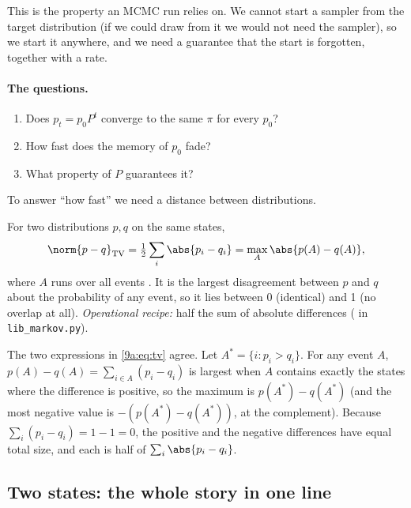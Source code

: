 This is the property an MCMC run relies on. We cannot start a sampler from the target
distribution (if we could draw from it we would not need the sampler), so we start it
anywhere, and we need a guarantee that the start is forgotten, together with a rate.

\paragraph{The questions.}
\begin{enumerate}[itemsep=1pt]
  \item Does $p_t=p_0P^t$ converge to the same $\pi$ for every $p_0$?
  \item How fast does the memory of $p_0$ fade?
  \item What property of $P$ guarantees it?
\end{enumerate}

To answer ``how fast'' we need a distance between distributions.

\begin{workdef}
For two distributions $p,q$ on the same states,
\begin{equation}
  \norm{p-q}_{\rm TV}=\tfrac12\sum_i\abs{p_i-q_i}=\max_{A}\abs{p(A)-q(A)},
  \label{9a:eq:tv}
\end{equation}
where $A$ runs over all events . It is the largest disagreement
between $p$ and $q$ about the probability of any event, so it lies between 0 (identical) and
1 (no overlap at all). \emph{Operational recipe:} half the sum of absolute differences
( in \texttt{lib\_markov.py}).
\end{workdef}

The two expressions in \eqref{9a:eq:tv} agree. Let $A^*=\{i:p_i>q_i\}$. For any event $A$,
$p(A)-q(A)=\sum_{i\in A}(p_i-q_i)$ is largest when $A$ contains exactly the states where the
difference is positive, so the maximum is $p(A^*)-q(A^*)$ (and the most negative value is
$-(p(A^*)-q(A^*))$, at the complement). Because $\sum_i(p_i-q_i)=1-1=0$, the positive and the
negative differences have equal total size, and each is half of $\sum_i\abs{p_i-q_i}$.

\subsection{Two states: the whole story in one line}
\label{9a:sec:two-state}


